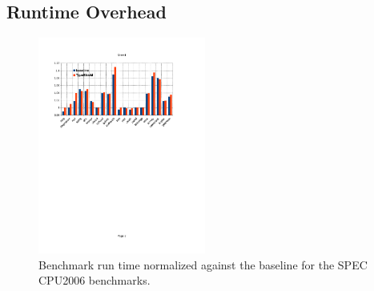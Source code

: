 %
%
%
%
%

\subsection{Runtime Overhead}
\label{section:typeshieldoverheadperformance}

\begin{figure}[h!]
    \centering
    \includegraphics[width=0.49\textwidth]{figures/speccpu2006.pdf}
    \caption{Benchmark run time normalized against the baseline for the SPEC CPU2006 benchmarks.
    }
    \label{fig:awesome_image}
\end{figure}


